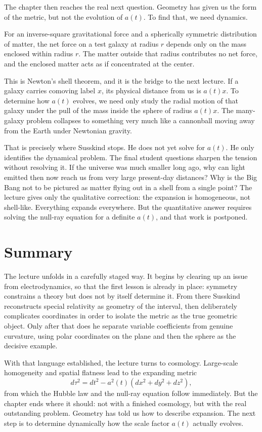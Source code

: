 The chapter then reaches the real next question. Geometry has given us the form of the metric, but not the evolution of \(a(t)\). To find that, we need dynamics.

\begin{proposition}
For an inverse-square gravitational force and a spherically symmetric distribution of matter, the net force on a test galaxy at radius \(r\) depends only on the mass enclosed within radius \(r\). The matter outside that radius contributes no net force, and the enclosed matter acts as if concentrated at the center.
\end{proposition}

This is Newton's shell theorem, and it is the bridge to the next lecture. If a galaxy carries comoving label \(x\), its physical distance from us is \(a(t)x\). To determine how \(a(t)\) evolves, we need only study the radial motion of that galaxy under the pull of the mass inside the sphere of radius \(a(t)x\). The many-galaxy problem collapses to something very much like a cannonball moving away from the Earth under Newtonian gravity.

That is precisely where Susskind stops. He does not yet solve for \(a(t)\). He only identifies the dynamical problem. The final student questions sharpen the tension without resolving it. If the universe was much smaller long ago, why can light emitted then now reach us from very large present-day distances? Why is the Big Bang not to be pictured as matter flying out in a shell from a single point? The lecture gives only the qualitative correction: the expansion is homogeneous, not shell-like. Everything expands everywhere. But the quantitative answer requires solving the null-ray equation for a definite \(a(t)\), and that work is postponed.

\section{Summary}

The lecture unfolds in a carefully staged way. It begins by clearing up an issue from electrodynamics, so that the first lesson is already in place: symmetry constrains a theory but does not by itself determine it. From there Susskind reconstructs special relativity as geometry of the interval, then deliberately complicates coordinates in order to isolate the metric as the true geometric object. Only after that does he separate variable coefficients from genuine curvature, using polar coordinates on the plane and then the sphere as the decisive example.

With that language established, the lecture turns to cosmology. Large-scale homogeneity and spatial flatness lead to the expanding metric
\begin{equation}
d\tau^2 = dt^2 - a^2(t)\left(dx^2+dy^2+dz^2\right),
\end{equation}
from which the Hubble law and the null-ray equation follow immediately. But the chapter ends where it should: not with a finished cosmology, but with the real outstanding problem. Geometry has told us how to describe expansion. The next step is to determine dynamically how the scale factor \(a(t)\) actually evolves.